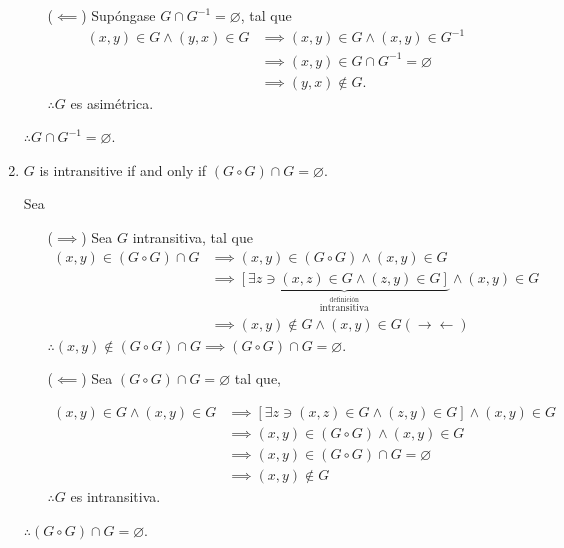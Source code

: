 \begin{problema}
\begin{enumerate}
\begin{dem}
\begin{enumerate}
				\item[($\impliedby$)] Supóngase $G\cap G^{-1}=\varnothing$, tal que
				\begin{align*}
					(x,y)\in G \wedge (y,x)\in G &\implies (x,y)\in G \wedge (x,y)\in G^{-1}\\
					&\implies (x,y)\in G\cap G^{-1}=\varnothing\\
					&\implies (y,x)\not\in G.
				\end{align*}
			$\therefore G$ es asimétrica.
			\end{enumerate}
			$\therefore G \cap G^{-1}=\varnothing$.
	
		\end{dem}
		\item $G$ is intransitive if and only if $(G \circ G) \cap G=\varnothing$.
			\begin{dem}
			Sea
			\begin{enumerate}
				\item[($\implies$)] Sea $G$ intransitiva, tal que 
				\begin{align*}
					(x,y)\in (G\circ G)\cap G &\implies (x,y)\in (G\circ G) \wedge (x,y)\in G\\
					&\implies \underbrace{\left[\exists z \ni (x,z)\in G \wedge (z,y)\in G \right]}_{\stackrel{\text{definición}}{\text{intransitiva}}}\wedge (x,y)\in G\\
					&\implies (x,y)\not\in G \wedge (x,y)\in G (\to\gets)
				\end{align*}
			$\therefore (x,y)\not\in (G \circ G) \cap G \implies (G \circ G) \cap G =\varnothing$. 
				
				\item[($\impliedby$)] Sea $(G \circ G) \cap G=\varnothing$ tal que, 
				
				\begin{align*}
					(x,y)\in G \wedge (x,y)\in G &\implies  \left[\exists z\ni (x,z)\in G\wedge (z,y)\in G\right]\wedge (x,y)\in G\\
					&\implies (x,y)\in (G\circ G)\wedge (x,y)\in G\\
					&\implies (x,y)\in (G \circ G) \cap G =\varnothing\\
					&\implies (x,y)\not\in G
				\end{align*}
				$\therefore G$ es intransitiva. 
			\end{enumerate}
			$\therefore (G \circ G) \cap G=\varnothing$.
			
		\end{dem}
	\end{enumerate}
\end{problema}

